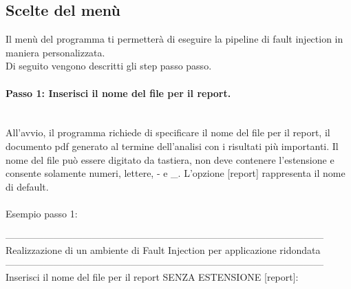 \documentclass{article}
\begin{document}
\subsection{Scelte del menù}
Il menù del programma ti permetterà di eseguire la pipeline di fault injection in maniera personalizzata.\\
Di seguito vengono descritti gli step passo passo.

\paragraph{Passo 1: Inserisci il nome del file per il report.}\leavevmode\\
All'avvio, il programma richiede di specificare il nome del file per il report, il documento pdf generato al termine dell'analisi con i risultati più importanti.
Il nome del file può essere digitato da tastiera, non deve contenere l'estensione e consente solamente numeri, lettere, - e \_.
L'opzione [report] rappresenta il nome di default.\\ \\
Esempio passo 1:
\begin{tcolorbox}[colback=black,coltext=white,sharp corners,boxrule=0.5mm,width=\textwidth]
---------------------------------------------------------------------------------------------------\\
 Realizzazione di un ambiente di Fault Injection per applicazione ridondata \\
 ---------------------------------------------------------------------------------------------------\\

Inserisci il nome del file per il report SENZA ESTENSIONE [report]:
\end{tcolorbox}
\end{document}
